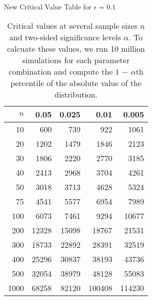 \begin{table}[ht]
\centering
\caption{New Critical Value Table for $\epsilon$ = $0.1$}
\label{tab:crit_val_eps_0.1}
\begin{tabular}{rrrrr}
  \hline
$n$ & 0.05 & 0.025 & 0.01 & 0.005 \\ 
  \hline
10 & 600 & 739 & 922 & 1061 \\ 
  20 & 1202 & 1479 & 1846 & 2123 \\ 
  30 & 1806 & 2220 & 2770 & 3185 \\ 
  40 & 2413 & 2968 & 3704 & 4261 \\ 
  50 & 3018 & 3713 & 4628 & 5324 \\ 
  75 & 4541 & 5577 & 6954 & 7989 \\ 
  100 & 6073 & 7461 & 9294 & 10677 \\ 
  200 & 12328 & 15098 & 18767 & 21531 \\ 
  300 & 18733 & 22892 & 28391 & 32519 \\ 
  400 & 25296 & 30837 & 38193 & 43736 \\ 
  500 & 32054 & 38979 & 48128 & 55083 \\ 
  1000 & 68258 & 82120 & 100408 & 114230 \\ 
   \hline
\end{tabular}
\\[10pt]
\caption*{Critical values at several sample sizes $n$ and two-sided significance levels $\alpha$. To calcuate these values, we run 10 million simulations for each parameter combination and compute the $1$ $-$ $\alpha$th percentile of the absolute value of the distribution.}
\end{table}
